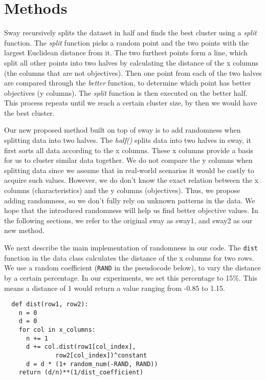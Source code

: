 \section{Methods}
\label{sec:method}

Sway recursively splits the dataset in half and finds the best cluster
using a \textit{split} function. The \textit{split} function picks a
random point and the two points with the largest Euclidean distance from
it. The two furthest points form a line, which split all other points
into two halves by calculating the distance of the x columns (the
columns that are not objectives). Then one point from each of the two
halves are compared through the \textit{better} function, to determine
which point has better objectives (y columns). The \textit{split}
function is then executed on the better half. This process repeats until
we reach a certain cluster size, by then we would have the best cluster.


Our new proposed method built on top of sway is to add randomness when
splitting data into two halves. The \textit{half()} splits data into two
halves in sway, it first sorts all data according to the x columns.
These x columns provide a basis for us to cluster similar data together.
We do not compare the y columns when splitting data since we assume that
in real-world scenarios it would be costly to acquire such values.
However, we do don't know the
exact relation between the x columns (characteristics) and the y columns
(objectives). Thus, we propose adding randomness, so we don't fully rely
on unknown patterns in the data. We hope that the introduced randomness
will help us find better objective values. In the following sections, we
refer to the original sway as sway1, and sway2 as our new method.

We next describe the main implementation of randomness in our code. The
\verb|dist| function in the data class calculates the distance of the
x columns for two rows. We use a random coefficient (\verb|RAND| in the
pseudocode below), to vary the distance by a certain percentage. In our
experiments, we set this percentage to 15\%. This means a distance of 1
would return a value ranging from -0.85 to 1.15.

\begin{lstlisting}
  def dist(row1, row2):
    n = 0
    d = 0 
    for col in x_columns:
      n += 1
      d += col.dist(row1[col_index], 
              row2[col_index])^constant
      d = d * (1+ random_num(-RAND, RAND))
    return (d/n)**(1/dist_coefficient)
\end{lstlisting}

